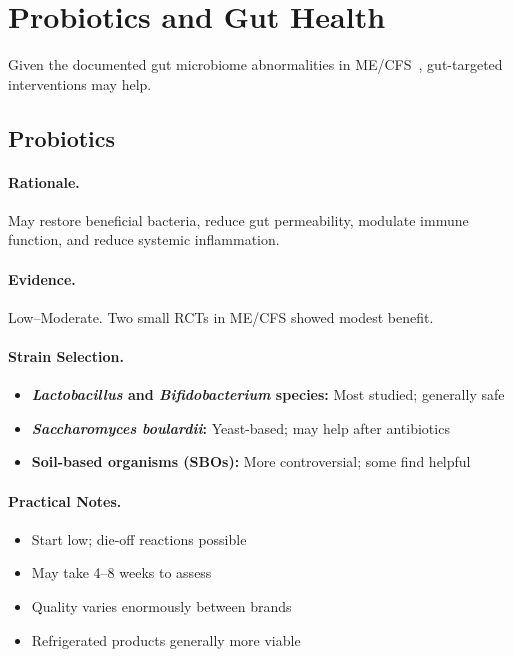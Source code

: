 \section{Probiotics and Gut Health}
\label{sec:probiotics}

Given the documented gut microbiome abnormalities in ME/CFS~\cite{Giloteaux2016, ButyrateDeficiency2023}, gut-targeted interventions may help.

\subsection{Probiotics}

\paragraph{Rationale.} May restore beneficial bacteria, reduce gut permeability, modulate immune function, and reduce systemic inflammation.

\paragraph{Evidence.} Low--Moderate. Two small RCTs in ME/CFS showed modest benefit.

\paragraph{Strain Selection.}
\begin{itemize}
    \item \textbf{\textit{Lactobacillus} and \textit{Bifidobacterium} species:} Most studied; generally safe
    \item \textbf{\textit{Saccharomyces boulardii}:} Yeast-based; may help after antibiotics
    \item \textbf{Soil-based organisms (SBOs):} More controversial; some find helpful
\end{itemize}

\paragraph{Practical Notes.}
\begin{itemize}
    \item Start low; die-off reactions possible
    \item May take 4--8 weeks to assess
    \item Quality varies enormously between brands
    \item Refrigerated products generally more viable
\end{itemize}

